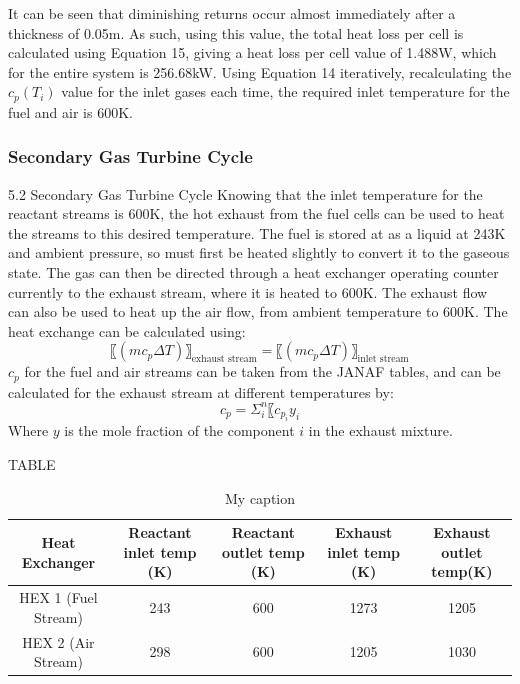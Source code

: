 It can be seen that diminishing returns occur almost immediately after a thickness of 0.05m. As such, using this value, the total heat loss per cell is calculated using Equation 15, giving a heat loss per cell value of 1.488W, which for the entire system is 256.68kW. Using Equation 14 iteratively, recalculating the $c_{p}(T_i )$  value for the inlet gases each time, the required inlet temperature for the fuel and air is 600K.
    \subsubsection{Secondary Gas Turbine Cycle}
        5.2 Secondary Gas Turbine Cycle
Knowing that the inlet temperature for the reactant streams is 600K, the hot exhaust from the fuel cells can be used to heat the streams to this desired temperature. The fuel is stored at as a liquid at 243K and ambient pressure, so must first be heated slightly to convert it to the gaseous state. The gas can then be directed through a heat exchanger operating counter currently to the exhaust stream, where it is heated to 600K. The exhaust flow can also be used to heat up the air flow, from ambient temperature to 600K. The heat exchange can be calculated using:
\begin{equation}
 〖(mc_p \Delta T)〗_{\text{exhaust stream}}= 〖(mc_p \Delta T)〗_{\text{inlet stream}}			
 \end{equation}
$c_p$ for the fuel and air streams can be taken from the JANAF tables, and can be calculated for the exhaust stream at different temperatures by:
\begin{equation}
 c_p= \Sigma_{i}^{n}〖c_{p_{i}}  y_i						
  \end{equation}
Where $y$ is the mole fraction of the component $i$ in the exhaust mixture. 


TABLE
\begin{table}[h!]
\centering
\caption{My caption}
\label{lewisHEXtemps}
\begin{tabular}{|c|c|c|c|c|}
\hline
\textbf{Heat Exchanger} & \textbf{Reactant inlet temp (K)} & \textbf{Reactant outlet temp (K)} & \textbf{Exhaust inlet temp (K)} & \textbf{Exhaust outlet temp(K)} \\ \hline
HEX 1 (Fuel Stream)     & 243                              & 600                               & 1273                            & 1205                            \\ \hline
HEX 2 (Air Stream)      & 298                              & 600                               & 1205                            & 1030                            \\ \hline
\end{tabular}
\end{table}

